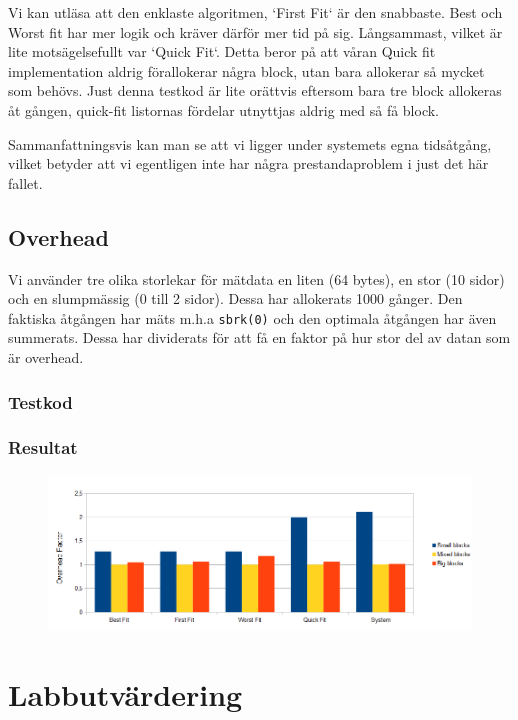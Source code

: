 \documentclass[a4paper,10pt,titlepage]{article}
\begin{document}
Vi kan utläsa att den enklaste algoritmen, `First Fit` är den snabbaste. Best och Worst fit har mer logik och kräver därför mer tid på sig. Långsammast, vilket är lite motsägelsefullt var `Quick Fit`. Detta beror på att våran Quick fit implementation aldrig förallokerar några block, utan bara allokerar så mycket som behövs. Just denna testkod är lite orättvis eftersom bara tre block allokeras åt gången, quick-fit listornas fördelar utnyttjas aldrig med så få block.


Sammanfattningsvis kan man se att vi ligger under systemets egna tidsåtgång, vilket betyder att vi egentligen inte har några prestandaproblem i just det här fallet.

\subsection{Overhead}

Vi använder tre olika storlekar för mätdata en liten (64 bytes), en stor (10 sidor) och en slumpmässig (0 till 2 sidor). Dessa har allokerats 1000 gånger. Den faktiska åtgången har mäts m.h.a \texttt{sbrk(0)} och den optimala åtgången har även summerats. Dessa har dividerats för att få en faktor på hur stor del av datan som är overhead.

\subsubsection{Testkod}

\footnotesize{}

\subsubsection{Resultat}

\begin{figure}[H]
	\includegraphics[width=\textwidth]{overhead.png}
\end{figure}

\newpage
\section{Labbutvärdering}
\end{document}
